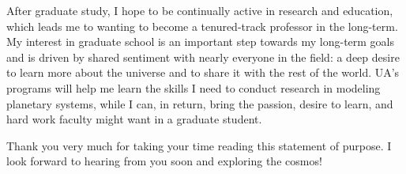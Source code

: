 \documentclass[11pt,letterpaper]{article}
\begin{document}
After graduate study, I hope to be continually active in research and education, which leads me to wanting to become a tenured-track professor in the long-term. My interest in graduate school is an important step towards my long-term goals and is driven by shared sentiment with nearly everyone in the field: a deep desire to learn more about the universe and to share it with the rest of the world. UA’s programs will help me learn the skills I need to conduct research in modeling planetary systems, while I can, in return, bring the passion, desire to learn, and hard work faculty might want in a graduate student.

Thank you very much for taking your time reading this statement of purpose. I look forward to hearing from you soon and exploring the cosmos!
\end{document}
